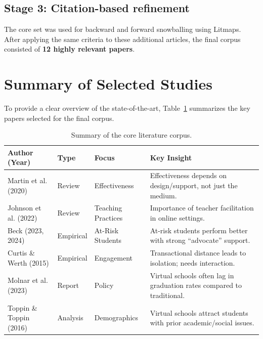 \subsection{Stage 3: Citation-based refinement}
The core set was used for backward and forward snowballing using Litmaps. After applying the same criteria to these additional articles, the final corpus consisted of \textbf{12 highly relevant papers}.

\section{Summary of Selected Studies}
To provide a clear overview of the state-of-the-art, Table~\ref{tab:lit_summary} summarizes the key papers selected for the final corpus.

\begin{table}[ht]
\centering
\scriptsize
\begin{tabular}{|p{3cm}|p{2cm}|p{3cm}|p{5cm}|}
\hline
\textbf{Author (Year)} & \textbf{Type} & \textbf{Focus} & \textbf{Key Insight} \\ \hline
Martin et al. (2020) & Review & Effectiveness & Effectiveness depends on design/support, not just the medium. \\ \hline
Johnson et al. (2022) & Review & Teaching Practices & Importance of teacher facilitation in online settings. \\ \hline
Beck (2023, 2024) & Empirical & At-Risk Students & At-risk students perform better with strong ``advocate'' support. \\ \hline
Curtis \& Werth (2015) & Empirical & Engagement & Transactional distance leads to isolation; needs interaction. \\ \hline
Molnar et al. (2023) & Report & Policy & Virtual schools often lag in graduation rates compared to traditional. \\ \hline
Toppin \& Toppin (2016) & Analysis & Demographics & Virtual schools attract students with prior academic/social issues. \\ \hline
\end{tabular}
\caption{Summary of the core literature corpus.}
\label{tab:lit_summary}
\end{table}


